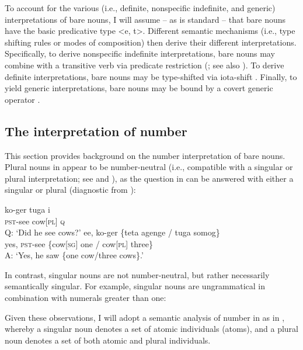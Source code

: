 \documentclass[output=paper]{LSP/langsci}
\begin{document}
To account for the various (i.e., definite, nonspecific indefinite, and generic) interpretations of bare nouns, I will assume -- as is standard -- that bare nouns have the basic predicative type <e, t>. Different semantic mechanisms (i.e., type shifting rules or modes of composition) then derive their different interpretations. Specifically, to derive nonspecific indefinite interpretations, bare nouns may combine with a transitive verb via predicate restriction (\citealt{Chung:2004}; see also \citealt{Carlson:1977}). To derive definite interpretations, bare nouns may be type-shifted via iota-shift \citep{Partee:1987}. Finally, to yield generic interpretations, bare nouns may be bound by a covert generic operator \citep{Krifka:1995}. 

\subsection{The interpretation of number}
\label{sec:landman:number}
This section provides background on the number interpretation of bare nouns. Plural nouns in  appear to be number-neutral (i.e., compatible with a singular or plural interpretation; see \citealt{Link:1983} and \citealt{Corbett:2000}), as the question in  can be answered with either a singular or plural  (diagnostic from \citealt{Link:1983}):

 \ea \label{ex:landman:15}
  \ea\label{ex:landman:barepluralquestion}
     \gll ko-ger tuga i\\
          \textsc{pst}-see cow[\textsc{pl}] \textsc{q}\\ 
     \glt Q: ‘Did he see cows?’
\ex\label{ex:landman:answers}
     \gll ee, ko-ger \{teta agenge / tuga somog\}\\
             yes, \textsc{pst}-see \{cow[\textsc{sg}] one / cow[\textsc{pl}] three\}\\
      \glt A: ‘Yes, he saw \{one cow/three cows\}.’
\z 
\z

In contrast, singular nouns are not number-neutral, but rather necessarily semantically singular. For example, singular nouns are ungrammatical in combination with numerals greater than one: 

\z

Given these observations, I will adopt a semantic analysis of number in  as in \citep{Link:1983}, whereby a singular noun denotes a set of atomic individuals (atoms), and a plural noun denotes a set of both atomic and plural individuals.
\end{document}
